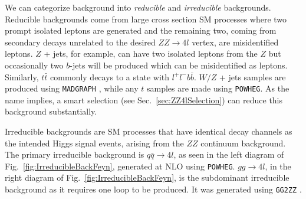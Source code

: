 We can categorize background into \textit{reducible} and \textit{irreducible} backgrounds. Reducible backgrounds come from large cross section SM processes where two prompt isolated leptons are generated and the remaining two, coming from secondary decays unrelated to the desired $ZZ\rightarrow 4l$ vertex, are misidentified leptons. $Z$ + jets, for example, can have two isolated leptons from the $Z$ but occasionally two $b$-jets will be produced which can be misidentified as leptons. Similarly, $t\bar{t}$ commonly decays to a state with $l^+l^-b\bar{b}$. $W/Z$ + jets samples are produced using {\tt MADGRAPH} \cite{Alwall:2007st}, while any $t$ samples are made using {\tt POWHEG}. As the name implies, a smart selection (see Sec.~\ref{sec:ZZ4lSelection}) can reduce this background substantially.

Irreducible backgrounds are SM processes that have identical decay channels as the intended Higgs signal events, arising from the $ZZ$ continuum background. The primary irreducible background is $q\bar{q}\rightarrow 4l$, as seen in the left diagram of Fig.~\ref{fig:IrreducibleBackFeyn}, generated at NLO using {\tt POWHEG}. $gg \rightarrow 4l$, in the right diagram of Fig.~\ref{fig:IrreducibleBackFeyn}, is the subdominant irreducible background as it requires one loop to be produced. It was generated using {\tt GG2ZZ} \cite{Binoth:2008pr}.

